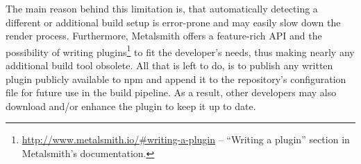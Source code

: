The main reason behind this limitation is, that automatically detecting a different or additional build setup is error-prone and may easily slow down the render process. Furthermore, Metalsmith offers a feature-rich API and the possibility of writing plugins\footnote{\url{http://www.metalsmith.io/\#writing-a-plugin} -- ``Writing a plugin'' section in Metalsmith's documentation.} to fit the developer's needs, thus making nearly any additional build tool obsolete. All that is left to do, is to publish any written plugin publicly available to npm and append it to the repository's configuration file for future use in the build pipeline. As a result, other developers may also download and/or enhance the plugin to keep it up to date.
